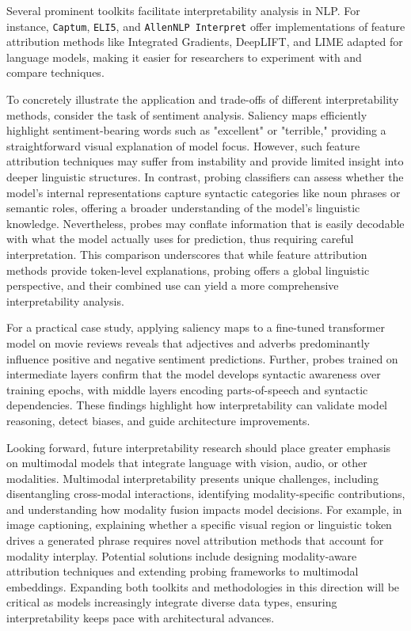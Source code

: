 \documentclass[sigconf]{acmart}
\begin{document}
Several prominent toolkits facilitate interpretability analysis in NLP. For instance, \texttt{Captum}, \texttt{ELI5}, and \texttt{AllenNLP Interpret} offer implementations of feature attribution methods like Integrated Gradients, DeepLIFT, and LIME adapted for language models, making it easier for researchers to experiment with and compare techniques.

To concretely illustrate the application and trade-offs of different interpretability methods, consider the task of sentiment analysis. Saliency maps efficiently highlight sentiment-bearing words such as "excellent" or "terrible," providing a straightforward visual explanation of model focus. However, such feature attribution techniques may suffer from instability and provide limited insight into deeper linguistic structures. In contrast, probing classifiers can assess whether the model’s internal representations capture syntactic categories like noun phrases or semantic roles, offering a broader understanding of the model's linguistic knowledge. Nevertheless, probes may conflate information that is easily decodable with what the model actually uses for prediction, thus requiring careful interpretation. This comparison underscores that while feature attribution methods provide token-level explanations, probing offers a global linguistic perspective, and their combined use can yield a more comprehensive interpretability analysis.

For a practical case study, applying saliency maps to a fine-tuned transformer model on movie reviews reveals that adjectives and adverbs predominantly influence positive and negative sentiment predictions. Further, probes trained on intermediate layers confirm that the model develops syntactic awareness over training epochs, with middle layers encoding parts-of-speech and syntactic dependencies. These findings highlight how interpretability can validate model reasoning, detect biases, and guide architecture improvements.

Looking forward, future interpretability research should place greater emphasis on multimodal models that integrate language with vision, audio, or other modalities. Multimodal interpretability presents unique challenges, including disentangling cross-modal interactions, identifying modality-specific contributions, and understanding how modality fusion impacts model decisions. For example, in image captioning, explaining whether a specific visual region or linguistic token drives a generated phrase requires novel attribution methods that account for modality interplay. Potential solutions include designing modality-aware attribution techniques and extending probing frameworks to multimodal embeddings. Expanding both toolkits and methodologies in this direction will be critical as models increasingly integrate diverse data types, ensuring interpretability keeps pace with architectural advances.
\end{document}
